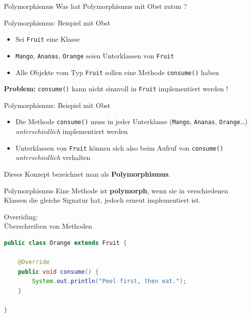 \documentclass[18pt]{beamer}
\begin{document}
\begin{frame}{Polymorphismus}
    Was hat Polymorphismus mit Obst zutun ?
\end{frame}

\begin{frame}{Polymorphismus: Beispiel mit Obst}
    \begin{itemize}
        \item Sei \texttt{Fruit} eine Klasse
        \item \texttt{Mango}, \texttt{Ananas}, \texttt{Orange} seien Unterklassen von \texttt{Fruit}
        \pause
        \vspace{.3in}
        \item Alle Objekte vom Typ \texttt{Fruit} sollen eine Methode \texttt{consume()} haben
    \end{itemize}
        \pause
        \vspace{.3in}
        \textbf{Problem:} \texttt{consume()} kann nicht sinnvoll in \texttt{Fruit} implementiert werden !
\end{frame}

\begin{frame}{Polymorphismus: Beispiel mit Obst}

    \begin{itemize}
        \item Die Methode \texttt{consume()} muss in jeder Unterklasse (\texttt{Mango}, \texttt{Ananas}, \texttt{Orange}\dots) \textit{unterschiedlich} implementiert werden
        \item Unterklassen von \texttt{Fruit} können sich also beim Aufruf von \texttt{consume()} \textit{unterschiedlich} verhalten
    \end{itemize}

    \pause
    \vspace{.2in}

    Dieses Konzept bezeichnet man als \textbf{Polymorphismus}.
\end{frame}

\begin{frame}{Polymorphismus}
    Eine Methode ist \textbf{polymorph}, wenn sie in verschiedenen Klassen die gleiche Signatur hat,
    jedoch erneut implementiert ist.

\end{frame}

\begin{frame}[fragile]{Overriding:\\ Überschreiben von Methoden}
    \begin{exampleblock}{}
        \begin{lstlisting}[language=Java,basicstyle=\scriptsize]
public class Orange extends Fruit {

    @Override
    public void consume() {
        System.out.println("Peel first, then eat.");
    }

}
        \end{lstlisting}

    \end{exampleblock}

\end{frame}
\end{document}
